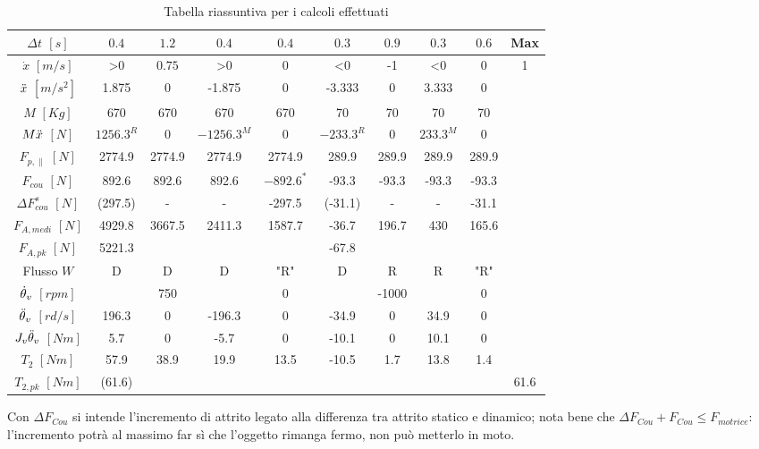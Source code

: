 \begin{table}[h]
\centering
    \begin{tabular}{c|c|c|c|c|c|c|c|c|c}
    \hline
    $\Delta t$ $[s]$ & $0.4$ & $1.2$ & $0.4$ & $0.4$ & $0.3$ & $0.9$ & $0.3$ & $0.6$ & Max \\ \hline
    $\dot x$ $[m/s]$ & >0 & \(0.75\) & >0 & 0 & <0 & -1 & <0 & 0 & 1 \\ \cline{1-1}
    $\Ddot x$ $[m/s^2]$ & 1.875 & 0 & -1.875 & 0 & -3.333 & 0 & 3.333 & 0 &  \\ \cline{1-1}
    $M$ $[Kg]$ & 670 & 670 & 670 & 670 & 70 & 70 & 70 & 70 &  \\ \cline{1-1}
    \hline
    $M \Ddot x$ $[N]$ & \(1256.3^R\) & 0 & \(-1256.3^M\) & 0 & \(-233.3^R\) & 0 & \(233.3^M\) & 0 &  \\ \cline{1-1}
    $F_{p,\parallel}$ $[N]$ & 2774.9 & 2774.9 & 2774.9 & 2774.9 & 289.9 & 289.9 & 289.9 & 289.9 &  \\ \cline{1-1}
    $F_{cou}$ $[N]$ & 892.6 & 892.6 & 892.6 & \(-892.6^*\) & -93.3 & -93.3 & -93.3 & -93.3 &  \\ \cline{1-1}
    $\Delta F_{cou}^s$ $[N]$ & (297.5) & - & - & -297.5 & (-31.1) & - & - & -31.1 &  \\ \cline{1-1}
    \hline
    $F_{A,medi}$ $[N]$ & 4929.8 & 3667.5 & 2411.3 & 1587.7 & -36.7 & 196.7 & 430 & 165.6 &  \\ \cline{1-1}
    $F_{A,pk}$ $[N]$ & 5221.3 &  &  &  & -67.8 &  &  &  &  \\ \cline{1-1}
    Flusso $W$ & D & D & D & "R" & D & R & R & "R" &  \\ \cline{1-1}
    \hline
    $\dot{\theta}_v$ $[rpm]$ &  & 750 &  & 0 &  & -1000 &  & 0 &  \\ \cline{1-1}
    $\Ddot{\theta}_v$ $[rd/s]$ & 196.3 & 0 & -196.3 & 0 & -34.9 & 0 & 34.9 & 0 &  \\ \cline{1-1}
    \hline
    $J_v\Ddot{\theta}_v$ $[Nm]$  & 5.7 & 0 & -5.7 & 0 & -10.1 & 0 & 10.1 & 0 &  \\ \cline{1-1}
    $T_2$ $[Nm]$ & 57.9 & 38.9 & 19.9 & 13.5 & -10.5 & 1.7 & 13.8 & 1.4 &  \\ \cline{1-1}
    $T_{2,pk}$ $[Nm]$ & (61.6) &  &  &  &  &  &  &  & 61.6 \\ \cline{1-1}
    \hline
    \end{tabular}
    \caption{Tabella riassuntiva per i calcoli effettuati}
\end{table}

Con $\Delta F_{Cou}$ si intende l'incremento di attrito legato alla differenza tra attrito statico e dinamico; nota bene che $\Delta F_{Cou} + F_{Cou} \leqslant F_{motrice}$: l'incremento potrà al massimo far sì che l'oggetto rimanga fermo, non può metterlo in moto.

